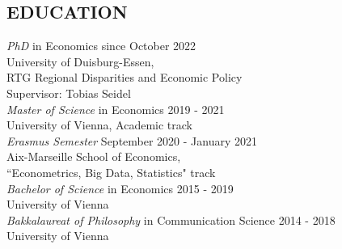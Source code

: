 \documentclass[margin, 12pt]{res} %
\begin{document}
	\begin{resume}
		
		
		
		\section{EDUCATION}
		
		{\sl PhD} in Economics \hfill since October 2022 \\
		University of Duisburg-Essen, \\
		RTG Regional Disparities and Economic Policy \\
		Supervisor: Tobias Seidel \vspace{0.2cm}\\
		{\sl Master of Science} in Economics \hfill 2019 - 2021 \\
		University of Vienna, Academic track \vspace{0.2cm}\\
		{\sl Erasmus Semester} \hfill September 2020 - January 2021 \\
		Aix-Marseille School of Economics, \\
		``Econometrics, Big Data, Statistics" track \vspace{0.2cm}\\
		{\sl Bachelor of Science} in Economics \hfill 2015 - 2019 \\
		University of Vienna \vspace{0.2cm}\\
		{\sl Bakkalaureat of Philosophy} in Communication Science \hfill 2014 - 2018 \\
		University of Vienna


\end{resume}
\end{document}
